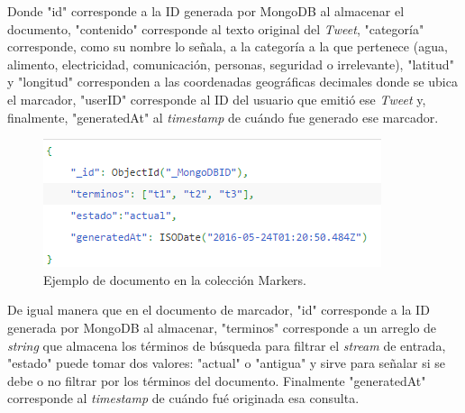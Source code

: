 Donde "id" corresponde a la ID generada por MongoDB al almacenar el documento, "contenido" corresponde al texto original del \textit{Tweet}, "categoría" corresponde, como su nombre lo señala, a la categoría a la que pertenece (agua, alimento, electricidad, comunicación, personas, seguridad o irrelevante), "latitud" y "longitud" corresponden a las coordenadas geográficas decimales donde se ubica el marcador, "userID" corresponde al ID del usuario que emitió ese \textit{Tweet} y, finalmente, "generatedAt" al \textit{timestamp} de cuándo fue generado ese marcador.\\

\begin{figure}[H]
	\centering
	\captionsetup{justification=centering}
	\includegraphics[scale=0.8]{images/query.png}
	\caption[Ejemplo de documento en la colección Markers.]{Ejemplo de documento en la colección Markers.}
	\label{fig:Query}
\end{figure}

De igual manera que en el documento de marcador, "id" corresponde a la ID generada por MongoDB al almacenar, "terminos" corresponde a un arreglo de \textit{string} que almacena los términos de búsqueda para filtrar el \textit{stream} de entrada, "estado" puede tomar dos valores: "actual" o "antigua" y sirve para señalar si se debe o no filtrar por los términos del documento. Finalmente "generatedAt" corresponde al \textit{timestamp} de cuándo fué originada esa consulta.\\







